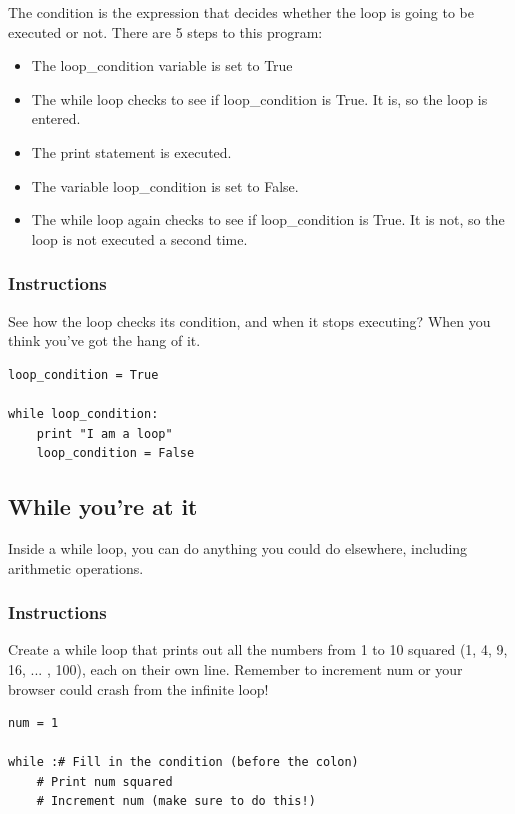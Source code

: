 \documentclass[12pt,a4paper,final,twoside,onecolumn,titlepage]{book}
\begin{document}
The condition is the expression that decides whether the loop is going to be executed or not. There are 5 steps to this program:
\begin{itemize}
\item    The loop\_condition variable is set to True

\item    The while loop checks to see if loop\_condition is True. It is, so the loop is entered.

\item    The print statement is executed.

\item    The variable loop\_condition is set to False.

\item    The while loop again checks to see if loop\_condition is True. It is not, so the loop is not executed a second time.
\end{itemize}
\subsubsection{Instructions}

See how the loop checks its condition, and when it stops executing? When you think you've got the hang of it.

\begin{lstlisting}
loop_condition = True

while loop_condition:
    print "I am a loop"
    loop_condition = False
\end{lstlisting}

\subsection{While you're at it}

Inside a while loop, you can do anything you could do elsewhere, including arithmetic operations.
\subsubsection{Instructions}

Create a while loop that prints out all the numbers from 1 to 10 squared (1, 4, 9, 16, ... , 100), each on their own line. Remember to increment num or your browser could crash from the infinite loop!
\begin{lstlisting}
num = 1

while :# Fill in the condition (before the colon)
    # Print num squared
    # Increment num (make sure to do this!)
\end{lstlisting}
\end{document}
